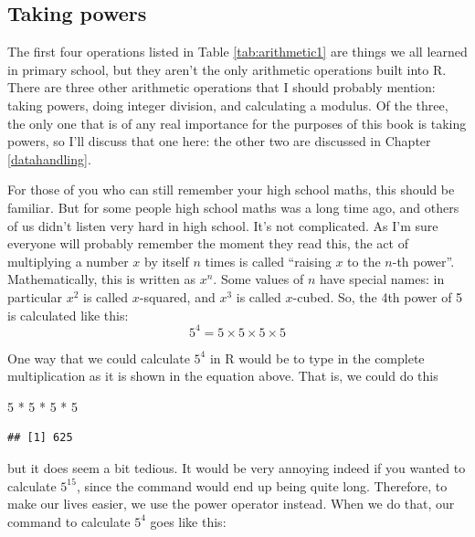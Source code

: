 \documentclass[
]{book}
\newenvironment{Shaded}{\begin{snugshade}}{\end{snugshade}}
\newcommand{\DecValTok}[1]{\textcolor[rgb]{0.00,0.00,0.81}{#1}}
\newcommand{\SpecialCharTok}[1]{\textcolor[rgb]{0.00,0.00,0.00}{#1}}
\begin{document}
\hypertarget{taking-powers}{%
\subsection{Taking powers}\label{taking-powers}}

The first four operations listed in Table \ref{tab:arithmetic1} are things we all learned in primary school, but they aren't the only arithmetic operations built into R. There are three other arithmetic operations that I should probably mention: taking powers, doing integer division, and calculating a modulus. Of the three, the only one that is of any real importance for the purposes of this book is taking powers, so I'll discuss that one here: the other two are discussed in Chapter \ref{datahandling}.

For those of you who can still remember your high school maths, this should be familiar. But for some people high school maths was a long time ago, and others of us didn't listen very hard in high school. It's not complicated. As I'm sure everyone will probably remember the moment they read this, the act of multiplying a number \(x\) by itself \(n\) times is called ``raising \(x\) to the \(n\)-th power''. Mathematically, this is written as \(x^n\). Some values of \(n\) have special names: in particular \(x^2\) is called \(x\)-squared, and \(x^3\) is called \(x\)-cubed. So, the 4th power of 5 is calculated like this:
\[
5^4 = 5 \times 5 \times 5 \times 5 
\]

One way that we could calculate \(5^4\) in R would be to type in the complete multiplication as it is shown in the equation above. That is, we could do this

\begin{Shaded}
\begin{Highlighting}[]
\DecValTok{5} \SpecialCharTok{*} \DecValTok{5} \SpecialCharTok{*} \DecValTok{5} \SpecialCharTok{*} \DecValTok{5}
\end{Highlighting}
\end{Shaded}

\begin{verbatim}
## [1] 625
\end{verbatim}

but it does seem a bit tedious. It would be very annoying indeed if you wanted to calculate \(5^{15}\), since the command would end up being quite long. Therefore, to make our lives easier, we use the power operator instead. When we do that, our command to calculate \(5^4\) goes like this:
\end{document}
